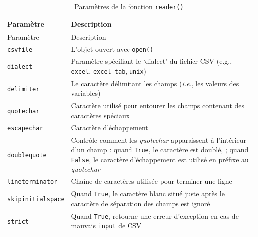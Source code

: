 \documentclass[
  12pt,
]{book}
\numberwithin{equation}{section}
\numberwithin{countremarque}{section}
\begin{document}
\begin{longtable}[]{@{}
  >{\raggedleft\arraybackslash}p{}
  >{\raggedleft\arraybackslash}p{}@{}}
\caption{\label{tab:parametres-reader-csv} Paramètres de la fonction \texttt{reader()}}\tabularnewline
\toprule\noalign{}
\begin{minipage}[b]{\linewidth}\raggedleft
Paramètre
\end{minipage} & \begin{minipage}[b]{\linewidth}\raggedleft
Description
\end{minipage} \\
\midrule\noalign{}
\endfirsthead
\toprule\noalign{}
\begin{minipage}[b]{\linewidth}\raggedleft
Paramètre
\end{minipage} & \begin{minipage}[b]{\linewidth}\raggedleft
Description
\end{minipage} \\
\midrule\noalign{}
\endhead
\bottomrule\noalign{}
\endlastfoot
\texttt{csvfile} & L'objet ouvert avec \texttt{open()} \\
\texttt{dialect} & Paramètre spécifiant le `dialect' du fichier CSV (e.g., \texttt{excel}, \texttt{excel-tab}, \texttt{unix}) \\
\texttt{delimiter} & Le caractère délimitant les champs (\emph{i.e.}, les valeurs des variables) \\
\texttt{quotechar} & Caractère utilisé pour entourer les champs contenant des caractères spéciaux \\
\texttt{escapechar} & Caractère d'échappement \\
\texttt{doublequote} & Contrôle comment les \emph{quotechar} apparaissent à l'intérieur d'un champ : quand \texttt{True}, le caractère est doublé, ; quand \texttt{False}, le caractère d'échappement est utilisé en préfixe au \emph{quotechar} \\
\texttt{lineterminator} & Chaîne de caractères utilisée pour terminer une ligne \\
\texttt{skipinitialspace} & Quand \texttt{True}, le caractère blanc situé juste après le caractère de séparation des champs est ignoré \\
\texttt{strict} & Quand \texttt{True}, retourne une erreur d'exception en cas de mauvais \texttt{input} de CSV \\
\end{longtable}
\end{document}
